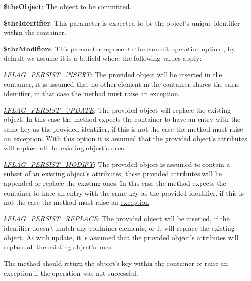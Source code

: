 \begin{DoxyItemize}
\item {\bfseries \$the\-Object}\-: The object to be committed. 
\item {\bfseries \$the\-Identifier}\-: This parameter is expected to be the object's unique identifier within the container. 
\item {\bfseries \$the\-Modifiers}\-: This parameter represents the commit operation options, by default we assume it is a bitfield where the following values apply\-: 
\begin{DoxyItemize}
\item {\itshape \hyperlink{}{k\-F\-L\-A\-G\-\_\-\-P\-E\-R\-S\-I\-S\-T\-\_\-\-I\-N\-S\-E\-R\-T}\/}\-: The provided object will be inserted in the container, it is assumed that no other element in the container shares the same identifier, in that case the method must raise an \hyperlink{}{exception}. 
\item {\itshape \hyperlink{}{k\-F\-L\-A\-G\-\_\-\-P\-E\-R\-S\-I\-S\-T\-\_\-\-U\-P\-D\-A\-T\-E}\/}\-: The provided object will replace the existing object. In this case the method expects the container to have an entry with the same key as the provided identifier, if this is not the case the method must raise an \hyperlink{}{exception}. With this option it is assumed that the provided object's attributes will replace all the existing object's ones. 
\item {\itshape \hyperlink{}{k\-F\-L\-A\-G\-\_\-\-P\-E\-R\-S\-I\-S\-T\-\_\-\-M\-O\-D\-I\-F\-Y}\/}\-: The provided object is assumed to contain a subset of an existing object's attributes, these provided attributes will be appended or replace the existing ones. In this case the method expects the container to have an entry with the same key as the provided identifier, if this is not the case the method must raise an \hyperlink{}{exception}. 
\item {\itshape \hyperlink{}{k\-F\-L\-A\-G\-\_\-\-P\-E\-R\-S\-I\-S\-T\-\_\-\-R\-E\-P\-L\-A\-C\-E}\/}\-: The provided object will be \hyperlink{}{inserted}, if the identifier doesn't match any container elements, or it will \hyperlink{}{replace} the existing object. As with \hyperlink{}{update}, it is assumed that the provided object's attributes will replace all the existing object's ones. 
\end{DoxyItemize}
\end{DoxyItemize}

The method should return the object's key within the container or raise an exception if the operation was not successful.


